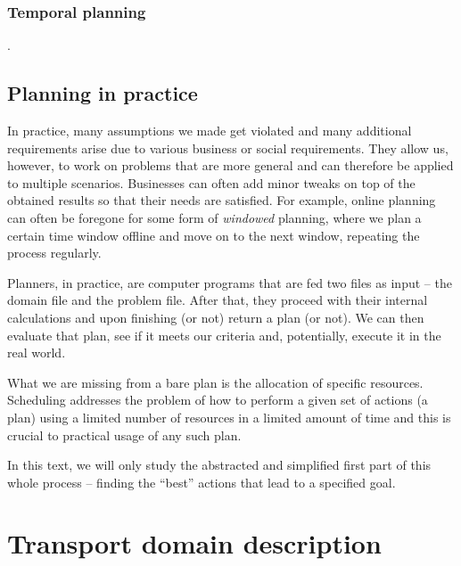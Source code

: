 
\subsubsection{Temporal planning}

.



\subsection{Planning in practice}

In practice, many assumptions we made get violated and many additional requirements arise
due to various business or social requirements. They allow us, however, to work
on problems that are more general and can therefore be applied to multiple scenarios.
Businesses can often add minor tweaks on top of the obtained results so that
their needs are satisfied. 
For example, online planning can often be foregone for some form of \textit{windowed} planning,
where we plan a certain time window offline and move on to the next window,
repeating the process regularly.

Planners, in practice, are computer programs that are fed two files as input
-- the domain file and the problem file. After that, they proceed with their internal calculations
and upon finishing (or not) return a plan (or not). 
We can then evaluate that plan, see if it meets our criteria and, potentially,
execute it in the real world.

What we are missing from a bare plan is the allocation of specific resources.
Scheduling addresses the problem of how to perform a given set of actions (a plan)
using a limited number of resources in a limited amount of time and
this is crucial to practical usage of any such plan. \citep[Chapter~15]{Ghallab2004}

In this text, we will only study the abstracted and simplified first part of this whole process
-- finding the ``best'' actions that lead to a specified goal.




\section{Transport domain description}

